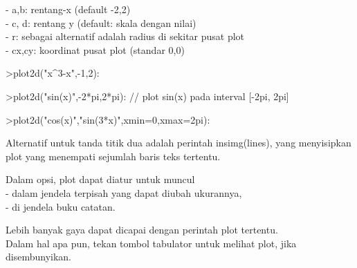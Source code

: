 \documentclass[12pt,arial,letterpaper]{book}
\begin{document}
\begin{eulernootebook}
\begin{eulercomment}
\begin{eulercomment}
\begin{eulernootebook}
\begin{eulercomment}
\begin{eulercomment}
\begin{eulercomment}
\begin{eulercomment}
\begin{eulercomment}
\begin{eulercomment}
\begin{eulercomment}
\begin{eulernotebook}
\begin{eulercomment}
\begin{eulercomment}
\begin{eulercomment}
-   a,b: rentang-x (default -2,2)\\
-   c, d: rentang y (default: skala dengan nilai)\\
-   r: sebagai alternatif adalah radius di sekitar pusat plot\\
-   cx,cy: koordinat pusat plot (standar 0,0)
\end{eulercomment}
\begin{eulerprompt}
>plot2d("x^3-x",-1,2):
\end{eulerprompt}
\begin{eulerprompt}
>plot2d("sin(x)",-2*pi,2*pi): // plot sin(x) pada interval [-2pi, 2pi]
\end{eulerprompt}
\begin{eulerprompt}
>plot2d("cos(x)","sin(3*x)",xmin=0,xmax=2pi):
\end{eulerprompt}
\begin{eulercomment}
Alternatif untuk tanda titik dua adalah perintah insimg(lines), yang
menyisipkan plot yang menempati sejumlah baris teks tertentu.

Dalam opsi, plot dapat diatur untuk muncul\\
- dalam jendela terpisah yang dapat diubah ukurannya,\\
- di jendela buku catatan.

Lebih banyak gaya dapat dicapai dengan perintah plot tertentu.\\
Dalam hal apa pun, tekan tombol tabulator untuk melihat plot, jika
disembunyikan.


\end{eulercomment}
\end{eulercomment}
\end{eulercomment}
\end{eulernotebook}
\end{eulercomment}
\end{eulercomment}
\end{eulercomment}
\end{eulercomment}
\end{eulercomment}
\end{eulercomment}
\end{eulercomment}
\end{eulernootebook}
\end{eulercomment}
\end{eulercomment}
\end{eulernootebook}
\end{document}
